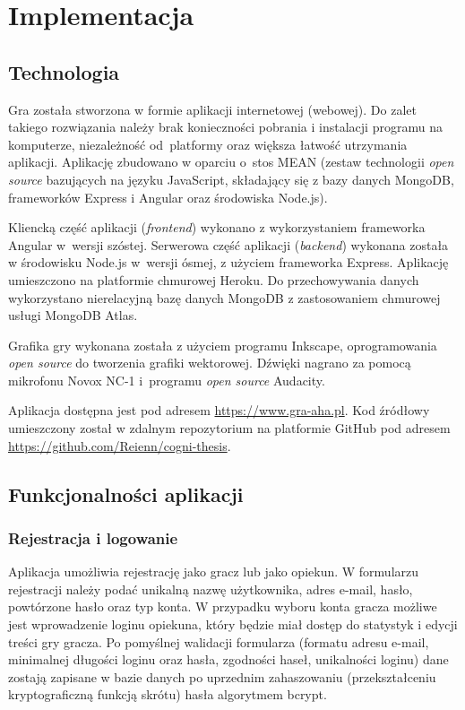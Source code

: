 \chapter{Implementacja}
\thispagestyle{firststyle}

\section{Technologia}
    
    Gra została stworzona w formie aplikacji internetowej (webowej).
    Do zalet takiego rozwiązania należy brak konieczności pobrania i instalacji programu na komputerze, niezależność od~platformy oraz większa łatwość utrzymania aplikacji.
    Aplikację zbudowano w oparciu o~stos MEAN (zestaw technologii \emph{open source} bazujących na języku JavaScript, składający się z bazy danych MongoDB, frameworków Express i Angular oraz środowiska Node.js).
    
    Kliencką część aplikacji (\emph{frontend}) wykonano z wykorzystaniem frameworka Angular w~wersji szóstej.
    Serwerowa część aplikacji (\emph{backend}) wykonana została w środowisku Node.js w~wersji ósmej, z użyciem frameworka Express.
    Aplikację umieszczono na platformie chmurowej Heroku.
    Do przechowywania danych wykorzystano nierelacyjną bazę danych MongoDB z zastosowaniem chmurowej usługi MongoDB Atlas.
    
    Grafika gry wykonana została z użyciem programu Inkscape, oprogramowania \emph{open source} do tworzenia grafiki wektorowej.
    Dźwięki nagrano za pomocą mikrofonu Novox NC-1 i~programu \emph{open source} Audacity.
    
    Aplikacja dostępna jest pod adresem \url{https://www.gra-aha.pl}.
    Kod źródłowy umieszczony został w zdalnym repozytorium na platformie GitHub pod adresem \url{https://github.com/Reienn/cogni-thesis}.  
    
\section{Funkcjonalności aplikacji}
    
    \subsection{Rejestracja i logowanie}
        Aplikacja umożliwia rejestrację jako gracz lub jako opiekun.
        W formularzu rejestracji należy podać unikalną nazwę użytkownika, adres e-mail, hasło, powtórzone hasło oraz typ konta.
        W przypadku wyboru konta gracza możliwe jest wprowadzenie loginu opiekuna, który będzie miał dostęp do statystyk i edycji treści gry gracza.
        Po pomyślnej walidacji formularza (formatu adresu e-mail, minimalnej długości loginu oraz hasła, zgodności haseł, unikalności loginu) dane zostają zapisane w bazie danych po uprzednim zahaszowaniu (przekształceniu kryptograficzną funkcją skrótu) hasła algorytmem bcrypt.
        
